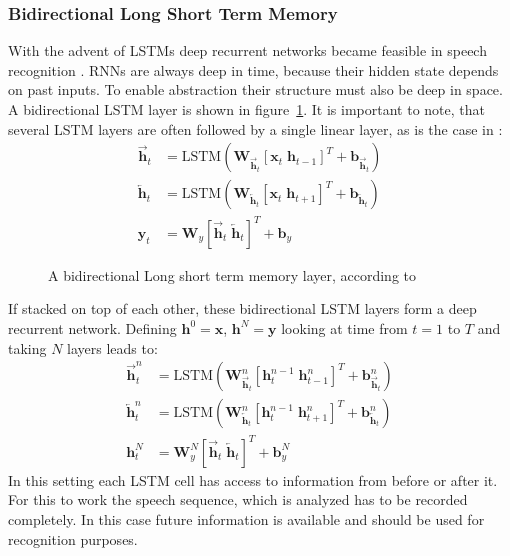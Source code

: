 \subsubsection{Bidirectional Long Short Term Memory}
With the advent of LSTMs deep recurrent networks became feasible in speech recognition \cite{Graves2013b}. RNNs are always deep in time, because their hidden state depends on past inputs. To enable abstraction their structure must also be deep in space. A bidirectional LSTM layer is shown in figure~\ref{fig:blstm}. It is important to note, that several LSTM layers are often followed by a single linear layer, as is the case in \cite{Graves2013b}:
\begin{align}
\overrightarrow{\mathbf{h}}_t &= \text{LSTM}(\mathbf{W}_{\overrightarrow{\mathbf{h}}_t} [\mathbf{x}_t \; \mathbf{h}_{t-1}]^T + \mathbf{b}_{\overrightarrow{\mathbf{h}}_t}) 
\\
\overleftarrow{\mathbf{h}}_t &= \text{LSTM}(\mathbf{W}_{\overleftarrow{\mathbf{h}}_t} [\mathbf{x}_t \; \mathbf{h}_{t+1}]^T + \mathbf{b}_{\overleftarrow{\mathbf{h}}_t})
\\
\mathbf{y}_t &= \mathbf{W}_{y} [\overrightarrow{\mathbf{h}}_t \; \overleftarrow{\mathbf{h}}_t]^T + \mathbf{b}_y  
\end{align}
\begin{figure}
\centering

\caption{A bidirectional Long short term memory layer, according to \cite{Graves2013b} }
\label{fig:blstm}
\end{figure}
If stacked on top of each other, these bidirectional LSTM layers form a deep recurrent network. Defining $\mathbf{h}^0 = \mathbf{x}$, $\mathbf{h}^N = \mathbf{y}$ looking at time from $t = 1$ to $T$ and taking $N$ layers leads to:
\begin{align}
\overrightarrow{\mathbf{h}}_t^n &= \text{LSTM}(\mathbf{W}_{\overrightarrow{\mathbf{h}}_t}^n [\mathbf{h}_t^{n-1} \; \mathbf{h}_{t-1}^n]^T + \mathbf{b}_{\overrightarrow{\mathbf{h}}_t}^n) 
\\
\overleftarrow{\mathbf{h}}_t^n &= \text{LSTM}(\mathbf{W}_{\overleftarrow{\mathbf{h}}_t}^n [\mathbf{h}_t^{n-1} \; \mathbf{h}_{t+1}^n]^T + \mathbf{b}_{\overleftarrow{\mathbf{h}}_t}^n)
\\
\mathbf{h}_t^N &= \mathbf{W}_{y}^N [\overrightarrow{\mathbf{h}}_t \; \overleftarrow{\mathbf{h}}_t]^T + \mathbf{b}_y^N
\end{align}
In this setting each LSTM cell has access to information from before or after it. For this to work the speech sequence, which is analyzed has to be recorded completely. In this case future information is available and should be used for recognition purposes.

